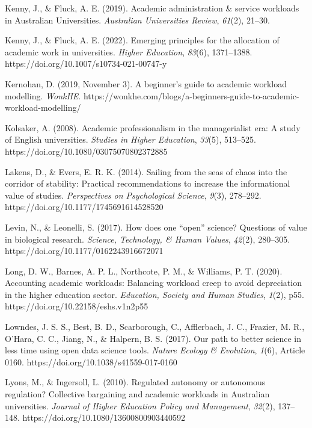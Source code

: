 \documentclass[meta, authordate]{jote-new-article}
\begin{document}
Kenny, J., & Fluck, A. E. (2019). Academic administration & service workloads in Australian Universities. \emph{Australian Universities Review}, \emph{61}(2), 21–30.



Kenny, J., & Fluck, A. E. (2022). Emerging principles for the allocation of academic work in universities. \emph{Higher Education}, \emph{83}(6), 1371–1388. https://doi.org/10.1007/s10734-021-00747-y



Kernohan, D. (2019, November 3). A beginner’s guide to academic workload modelling. \emph{WonkHE}. https://wonkhe.com/blogs/a-beginners-guide-to-academic-workload-modelling/



Kolsaker, A. (2008). Academic professionalism in the managerialist era: A study of English universities. \emph{Studies in Higher Education}, \emph{33}(5), 513–525. https://doi.org/10.1080/03075070802372885



Lakens, D., & Evers, E. R. K. (2014). Sailing from the seas of chaos into the corridor of stability: Practical recommendations to increase the informational value of studies. \emph{Perspectives on Psychological Science}, \emph{9}(3), 278–292. https://doi.org/10.1177/1745691614528520



Levin, N., & Leonelli, S. (2017). How does one “open” science? Questions of value in biological research. \emph{Science, Technology, & Human Values}, \emph{42}(2), 280–305. https://doi.org/10.1177/0162243916672071



Long, D. W., Barnes, A. P. L., Northcote, P. M., & Williams, P. T. (2020). Accounting academic workloads: Balancing workload creep to avoid depreciation in the higher education sector. \emph{Education, Society and Human Studies}, \emph{1}(2), p55. https://doi.org/10.22158/eshs.v1n2p55



Lowndes, J. S. S., Best, B. D., Scarborough, C., Afflerbach, J. C., Frazier, M. R., O’Hara, C. C., Jiang, N., & Halpern, B. S. (2017). Our path to better science in less time using open data science tools. \emph{Nature Ecology & Evolution}, \emph{1}(6), Article 0160. https://doi.org/10.1038/s41559-017-0160



Lyons, M., & Ingersoll, L. (2010). Regulated autonomy or autonomous regulation? Collective bargaining and academic workloads in Australian universities. \emph{Journal of Higher Education Policy and Management}, \emph{32}(2), 137–148. https://doi.org/10.1080/13600800903440592
\end{document}
